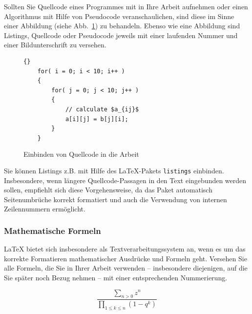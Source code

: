 Sollten Sie Quellcode eines Programmes mit in Ihre Arbeit aufnehmen oder einen Algorithmus mit Hilfe von Pseudocode veranschaulichen, sind diese im Sinne einer Abbildung (siehe Abb.~\ref{fig_Abb3}) zu behandeln.
Ebenso wie eine Abbildung sind Listings, Quellcode oder Pseudocode jeweils mit einer laufenden Nummer und einer Bildunterschrift zu versehen.

\begin{figure}[ht]
\lstset{language=c++}
\begin{lstlisting}{}
    for( i = 0; i < 10; i++ )
    {
        for( j = 0; j < 10; j++ )
        {
            // calculate $a_{ij}$
            a[i][j] = b[j][i];
        }
    }

\end{lstlisting}
  \caption{Einbinden von Quellcode in die Arbeit}
  \label{fig_Abb3}
\end{figure}

Sie können Listings z.B. mit Hilfe des \LaTeX-Pakets {\tt listings} einbinden.
Insbesondere, wenn längere Quellcode-Passagen in den Text eingebunden werden sollen, empfiehlt sich diese Vorgehensweise, da das Paket automatisch Seitenumbrüche korrekt formatiert und auch die Verwendung von internen Zeilennummern ermöglicht.

\subsubsection{Mathematische Formeln}

{\LaTeX} bietet sich insbesondere als Textverarbeitungssystem an, wenn es um das korrekte Formatieren mathematischer Ausdrücke und Formeln geht.
Versehen Sie alle Formeln, die Sie in Ihrer Arbeit verwenden -- insbesondere diejenigen, auf die Sie später noch Bezug nehmen --  mit einer entsprechenden Nummerierung.

\begin{equation}\label{formel1}
\frac{\sum_{n > 0} z^n}
{\prod_{1\leq k\leq n} (1-q^k)}
\end{equation}


